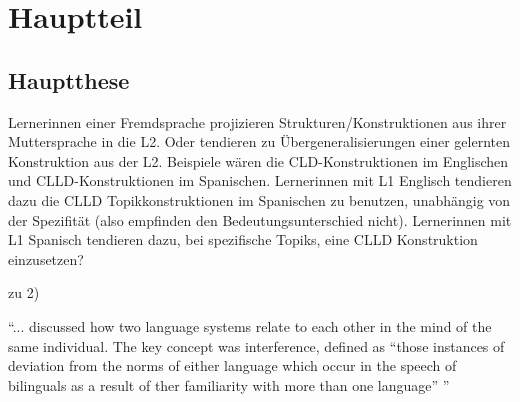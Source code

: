 \section{Hauptteil}

\subsection{Hauptthese}

Lernerinnen einer Fremdsprache projizieren Strukturen/Konstruktionen aus ihrer Muttersprache in die L2.
Oder tendieren zu Übergeneralisierungen einer gelernten Konstruktion aus der L2.
Beispiele wären die CLD-Konstruktionen im Englischen und CLLD-Konstruktionen im Spanischen.
Lernerinnen mit L1 Englisch tendieren dazu die CLLD Topikkonstruktionen im Spanischen zu benutzen, unabhängig von der Spezifität (also empfinden den Bedeutungsunterschied nicht).
Lernerinnen mit L1 Spanisch tendieren dazu, bei spezifische Topiks, eine CLLD Konstruktion einzusetzen?
\cite{Valenzuela05}

zu 2)

\cite{Weinreich79} ``... discussed how two language systems relate to each other in the mind of the same individual.
The key concept was interference, defined as ``those instances of deviation from the norms of either language which occur in the speech of bilinguals as a result of ther familiarity with more than one language'' \cite{Weinreich79} '' \cite{Cook93}

